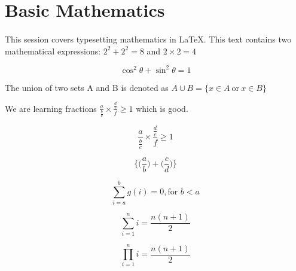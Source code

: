 \documentclass{article}
\begin{document}
	\section{Basic Mathematics}
    \paragraph{}
    This session covers typesetting mathematics in LaTeX. This text contains two mathematical expressions: $ 2^{2} + 2^{2} = 8$ and $ 2 \times 2 = 4$
    
    \[  \cos^2 \theta + \sin^2 \theta = 1 \]
    
    The union of two sets A and B is denoted as 
    $ A \cup B = \{ x \in A \ \text{or} \ x \in B \} $
    
    We are learning fractions $ \frac{a}{ \frac{b}{c} } \times \frac{\frac{d}{e}}{f} \geq 1 $ which is good.
    
    \[ \frac{a}{ \frac{b}{c} } \times \frac{\frac{d}{e}}{f} \geq 1 \]
    
    \[ \Bigg\{ \bigg(\frac{a}{b}\bigg) + \bigg(\frac{c}{d}\bigg) \Bigg\} \]
    
    \[ \sum_{i=a}^{b} g(i) = 0, \text{for } b < a  \]
    
    \[ \sum_{i=1}^{n} i = \frac{n(n+1)}{2} \]

    \[ \prod_{i=1}^{n} i = \frac{n(n+1)}{2} \]
\end{document}
